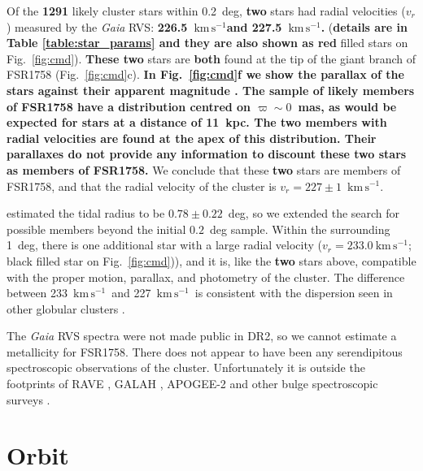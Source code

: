 \documentclass[fleqn,usenatbib]{mnras}
\newcommand{\kms}{\ensuremath{\textrm{km}\,\textrm{s}^{-1}}}
\begin{document}
Of the \textbf{1291} likely cluster stars within 0.2~deg, \textbf{two} stars had radial velocities ($v_r$) measured by the \textit{Gaia} RVS: \textbf{226.5~\kms and 227.5~\kms.} (\textbf{details are in Table \ref{table:star_params} and they are also shown as red} filled stars on Fig.\ \ref{fig:cmd}). \textbf{These two} stars are \textbf{both} found at the tip of the giant branch of FSR1758 (Fig.\ \ref{fig:cmd}c). \textbf{In Fig.\ \ref{fig:cmd}f we show the parallax of the stars against their apparent magnitude \citep[applying a $+0.052$~mas zero-point correction;][]{Zinn2018,Leung2019}. The sample of likely members of FSR1758 have a distribution centred on $\varpi\sim0$~mas, as would be expected for stars at a distance of 11~kpc. The two members with radial velocities are found at the apex of this distribution. Their parallaxes do not provide any information to discount these two stars as members of FSR1758.} We conclude that these \textbf{two} stars are members of FSR1758, and that the radial velocity of the cluster is $v_r=227\pm1$~\kms.

 estimated the tidal radius to be $0.78\pm0.22$~deg, so we extended the search for possible members beyond the initial $0.2$~deg sample. Within the surrounding 1~deg, there is one additional star with a large radial velocity ($v_r=233.0~\kms$; black filled star on Fig.\ \ref{fig:cmd})), and it is, like the \textbf{two} stars above, compatible with the proper motion, parallax, and photometry of the cluster. The difference between 233~\kms\ and 227~\kms\ is consistent with the dispersion seen in other globular clusters \cite[e.g., $\omega$~Cen has a velocity dispersion of $\sim10~\kms$;][]{Johnson:2010fs}.

The \textit{Gaia} RVS spectra were not made public in DR2, so we cannot estimate a metallicity for FSR1758. There does not appear to have been any serendipitous spectroscopic observations of the cluster. Unfortunately it is outside the footprints of RAVE \citep{Kunder:2017gp}, GALAH \citep{DeSilva:2015gr,Buder2018}, APOGEE-2 \citep{Zasowski:2017jy} and other bulge spectroscopic surveys \citep[e.g.,][]{Freeman2013,Zoccali2014,Howes:2016ji}.

\section{Orbit}\label{sec:orbit}
\end{document}
